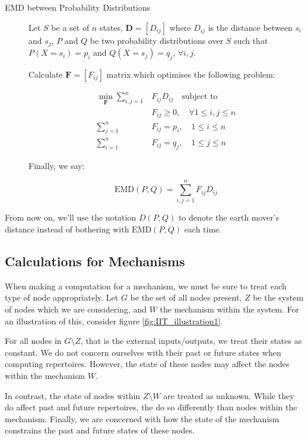\begin{description}
	\item[EMD between Probability Distributions] Let $S$ be a set of $n$ states, $\mathbf{D} = \left[ D_{ij}\right]$ where $D_{ij}$ is the distance between $s_i$ and $s_j$, $P$ and $Q$ be two probability distributions over $S$ such that $P(X = s_i) = p_i$ and $Q(X=s_j) = q_j$, $\forall i,j$. 
	
	Calculate $\mathbf{F} = \left[F_{ij}\right]$ matrix which optimises the following problem:
	
	\begin{align}
	\label{eq:EMD1}
	\min \limits_{\mathbf{F}}\sum \limits_{i,j=1}^n &F_{ij} D_{ij}\quad \text{subject to}\\
	&F_{ij}\geq 0,\quad \forall 1 \leq i,j \leq n\\
	\sum \limits_{j=1}^n &F_{ij} = p_i,\quad 1 \leq i \leq n\\
	\sum \limits_{i=1}^n &F_{ij} = q_j,\quad 1 \leq j \leq n
	\end{align}
	
	Finally, we say: 
	
	\begin{equation}
	\label{def:EMD}
	\text{EMD}(P, Q) = \sum \limits_{i,j=1}^{n} F_{ij} D_{ij}
	\end{equation}
\end{description}

From now on, we'll use the notation $D(P,Q)$ to denote the earth mover's distance instead of bothering with $\text{EMD}(P,Q)$ each time.

\subsection{Calculations for Mechanisms}\label{sec:little_phi}
When making a computation for a mechanism, we must be sure to treat each type of node appropriately. Let $G$ be the set of all nodes present, $Z$ be the system of nodes which we are considering, and $W$ the mechanism within the system. For an illustration of this, consider figure \ref{fig:IIT_illustration1}.

For all nodes in $G\setminus Z$, that is the external inputs/outputs, we treat their states as constant. We do not concern ourselves with their past or future states when computing repertoires. However, the state of these nodes may affect the nodes within the mechanism $W$.

In contrast, the state of nodes within $Z \setminus W$ are treated as unknown. While they do affect past and future repertoires, the do so differently than nodes within the mechanism. Finally, we are concerned with how the state of the mechanism constrains the past and future states of these nodes.

